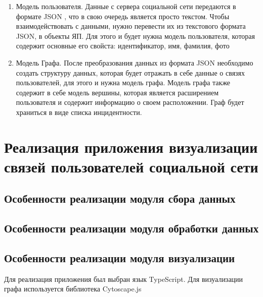 \documentclass[14pt, russian]{scrartcl}
\begin{document}
\begin{enumerate}
  \item{Модель пользователя. Данные с сервера социальной сети передаются в формате JSON \cite{JSON}, что в свою очередь является просто текстом. Чтобы взаимодействовать с данными, нужно перевести их из текстового формата JSON, в объекты ЯП. Для этого и будет нужна модель пользователя, которая содержит основные его свойста: идентификатор, имя, фамилия, фото}
  \item{Модель Графа. После преобразования данных из формата JSON необходимо создать структуру данных, которая будет отражать в себе данные о связях пользователей, для этого и нужна модель графа. Модель графа также содержит в себе модель вершины, которая является расширением пользователя и содержит информацию о своем расположении.
    Граф будет храниться в виде списка инцидентности.}
\end{enumerate}



\section{Реализация приложения визуализации связей пользователей социальной сети}

\subsection{Особенности реализации модуля сбора данных}
\subsection{Особенности реализации модуля обработки данных}
\subsection{Особенности реализации модуля визуализации}
Для реализация приложения был выбран язык TypeScript. Для визуализации графа используется библиотека Cytoscape.js \cite{Cytoscapejs}
\end{document}
